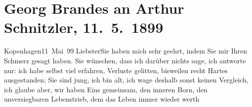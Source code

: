 

         
         \renewcommand{\erwaehntePersonen}{Personen: Richard Beer-Hofmann, Georg Brandes, Paul Goldmann, Jeanne Marni, Peter Nansen, Adolf Paul}
         \renewcommand{\erwaehnteInstitutionen}{Institutionen: Die Zeit. Wiener Wochenschrift, Die Zukunft, Le Siècle, L’Aurore, Neue Freie Presse, Svensk Dagbladet}
         \renewcommand{\erwaehnteOrte}{Orte: Europa, Finnland, Frankreich, Kopenhagen, Preußen, Schweden, Skandinavien, Stockholm, Südschleswig, Wien, Österreich}
         \renewcommand{\erwaehnteWerke}{Werke: Das Dänentum in Südjütland, Das Vermächtnis. Schauspiel in drei Akten, Der grüne Kakadu – Paracelsus – Die Gefährtin. Drei Einakter, Från Berlins teatrar, Samlede Skrifter [Gesammelte Werke], Svenska Dagbladet}
               \section[Georg Brandes an Arthur Schnitzler, 11. 5. 1899]{ Georg Brandes an Arthur Schnitzler, 11. 5. 1899}\nopagebreak{}\rehead{ }\begin{ledgroupsized}[t]{13cm}\normalsize\beginnumbering{} \toendnotes[C]{\smallbreak\pagebreak[2]} 
\toendnotes[C]{\smallbreak}\pstart
           \raggedleft{}{\pb}Kopenhagen11 Mai 99\pend
           \pstart
           Liebster\hspace*{3.5em}Sie haben mich sehr geehrt, indem Sie mir Ihren
               Schmerz gesagt haben. Sie wünschen, dass ich darüber nichts sage, ich antworte  nur: ich habe selbst viel erfahren, Verluste
               gelitten, bisweilen recht Hartes ausgestanden; Sie sind jung, ich \introOben{}bin\introOben{} alt, ich wage deshalb sonst keinen
               Vergleich, ich glaube aber, wir haben Eins gemeinsam,
               den inneren Born, den unversiegbaren Lebenstrieb, dem das Leben immer wieder werth

\end{ledgroupsized}
